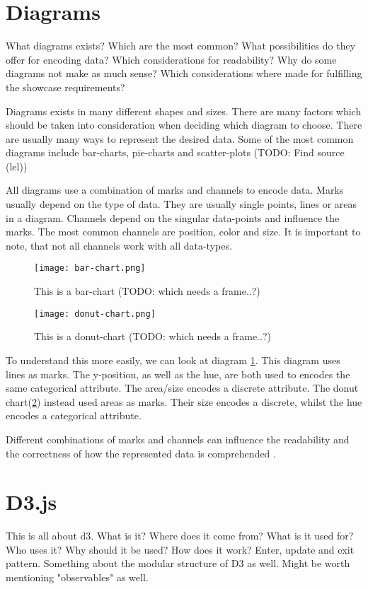 \section{Diagrams}
What diagrams exists? Which are the most common? What possibilities do they offer for encoding data? Which considerations for readability? Why do some diagrams not make as much sense? Which considerations where made for fulfilling the showcase requirements?

Diagrams exists in many different shapes and sizes. There are many factors which should be taken into consideration when deciding which diagram to choose. There are usually many ways to represent the desired data. Some of the most common diagrams include bar-charts, pie-charts and scatter-plots (TODO: Find source (lel))

All diagrams use a combination of marks and channels to encode data. Marks usually depend on the type of data. They are usually single points, lines or areas in a diagram. Channels depend on the singular data-points and influence the marks. The most common channels are position, color and size. It is important to note, that not all channels work with all data-types.

\begin{figure}
    \label{fig:bar-chart}
    \texttt{[image: bar-chart.png]}
    \caption[bar-chart]{This is a bar-chart (TODO: which needs a frame..?)}
\end{figure}

\begin{figure}
    \label{fig:donut-chart}
    \texttt{[image: donut-chart.png]}
    \caption[donut-chart]{This is a donut-chart (TODO: which needs a frame..?)}
\end{figure}

To understand this more easily, we can look at diagram \ref{fig:bar-chart}. This diagram uses lines as marks. The y-position, as well as the hue, are both used to encodes the same categorical attribute. The area/size encodes a discrete attribute. The donut chart(\ref{fig:donut-chart}) instead used areas as marks. Their size encodes a discrete, whilst the hue encodes a categorical attribute.

Different combinations of marks and channels can influence the readability and the correctness of how the represented data is comprehended \cite{heer2010crowdsourcing} \cite{mackinlay1986automating}.


\section{D3.js}
This is all about d3. What is it? Where does it come from? What is it used for? Who uses it? Why should it be used? How does it work? Enter, update and exit pattern. Something about the modular structure of D3 as well. Might be worth mentioning "observables" as well.

